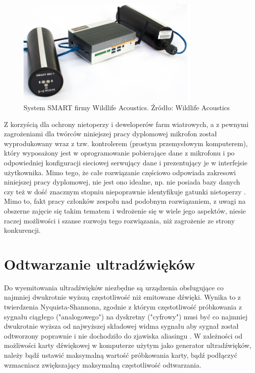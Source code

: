 \documentclass{sprz}
\begin{document}
\begin{figure}[h]
  \centering
  \includegraphics[width=0.8\textwidth]{sprz/smart.png}
  \caption{System SMART firmy Wildlife Acoustics. Źródło: Wildlife Acoustics}
  \label{img:smart}
\end{figure} 

Z korzyścią dla ochrony nietoperzy i deweloperów farm wiatrowych, a z pewnymi zagrożeniami dla twórców niniejszej pracy dyplomowej mikrofon został wyprodukowany wraz z tzw. kontrolerem (prostym przemysłowym komputerem), który wyposażony jest w oprogramowanie pobierające dane z mikrofonu i po odpowiedniej konfiguracji sieciowej serwujący dane i prezentujący je w interfejsie użytkownika. Mimo tego, że całe rozwiązanie częściowo odpowiada zakresowi niniejszej pracy dyplomowej, nie jest ono idealne, np. nie posiada bazy danych czy też w dość znacznym stopniu niepoprawnie identyfikuje gatunki nietoperzy \cite{kaleidoscope-bias}. Mimo to, fakt pracy członków zespołu nad podobnym rozwiązaniem, z uwagi na obszerne zajęcie się takim tematem i wdrożenie się w wiele jego aspektów, niesie raczej możliwości i szanse rozwoju tego rozwiązania, niż zagrożenie ze strony konkurencji.

\section{Odtwarzanie ultradźwięków}
Do wyemitowania ultradźwięków niezbędne są urządzenia obsługujące co najmniej dwukrotnie wyższą częstotliwość niż emitowane dźwięki. Wynika to z twierdzenia Nyquista-Shannona, zgodnie z którym częstotliwość próbkowania z sygnału ciągłego ("analogowego") na dyskretny ("cyfrowy") musi być co najmniej dwukrotnie wyższa od najwyższej składowej widma sygnału aby sygnał został odtworzony poprawnie i nie dochodziło do zjawiska aliasingu \cite{probkowanie}. W zależności od możliwości karty dźwiękowej w komputerze użytym jako generator ultradźwięków, należy bądź ustawić maksymalną wartość próbkowania karty, bądź podłączyć wzmacniacz zwiększający maksymalną częstotliwość odtwarzania.
\end{document}
